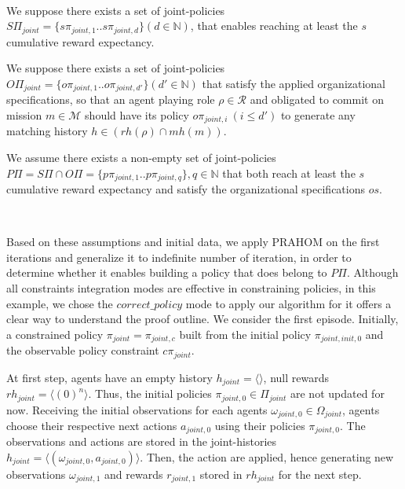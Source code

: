 \begin{proofoutline}
    \

    \noindent We suppose there exists a set of joint-policies $S\Pi_{joint} = \{s\pi_{joint,1}.. s\pi_{joint,d}\} \allowbreak (d \in \mathbb{N})$, that enables reaching at least the $s$ cumulative reward expectancy.

    \noindent We suppose there exists a set of joint-policies $O\Pi_{joint} = \{o\pi_{joint,1}.. o\pi_{joint,d'}\} (d' \in \mathbb{N})$ that satisfy the applied organizational specifications, so that an agent playing role $\rho \in \mathcal{R}$ and obligated to commit on mission $m \in \mathcal{M}$ should have its policy $o\pi_{joint,i} \ (i \leq d')$ to generate any matching history $h \in (rh(\rho) \cap mh(m))$.

    \noindent We assume there exists a non-empty set of joint-policies $P\Pi = S\Pi \cap O\Pi \allowbreak = \{p\pi_{joint,1}..p\pi_{joint,q}\}, q \in \mathbb{N}$ that both reach at least the $s$ cumulative reward expectancy and satisfy the organizational specifications $os$.

    \

    Based on these assumptions and initial data, we apply PRAHOM on the first iterations and generalize it to indefinite number of iteration, in order to determine whether it enables building a policy that does belong to $P\Pi$. Although all constraints integration modes are effective in constraining policies, in this example, we chose the $correct\_policy$ mode to apply our algorithm for it offers a clear way to understand the proof outline.
    We consider the first episode. Initially, a constrained policy $\pi_{joint} = \pi_{joint,c}$ built from the initial policy $\pi_{joint,init,0}$ and the observable policy constraint $c\pi_{joint}$.

    At first step, agents have an empty history $h_{joint} = \langle \rangle$, null rewards $rh_{joint} = \langle (0)^n \rangle $. Thus, the initial policies $\pi_{joint,0} \in \Pi_{joint}$ are not updated for now. Receiving the initial observations for each agents $\omega_{joint,0} \in \Omega_{joint}$, agents choose their respective next actions $a_{joint,0}$ using their policies $\allowbreak \pi_{joint,0}$. The observations and actions are stored in the joint-histories $h_{joint} \allowbreak = \allowbreak \langle \allowbreak (\omega_{joint,0}, \allowbreak a_{joint,0}) \rangle$. Then, the action are applied, hence generating new observations $\omega_{joint,1}$ and rewards $r_{joint,1}$ stored in $rh_{joint}$ for the next step.



\end{proofoutline}
